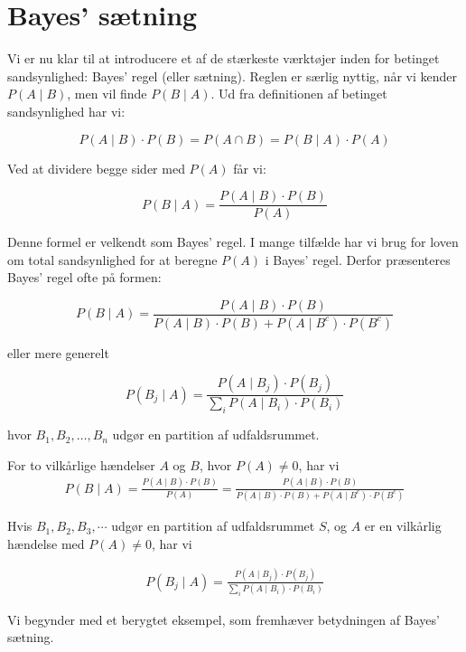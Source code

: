 \section{Bayes' sætning}
Vi er nu klar til at introducere et af de stærkeste værktøjer inden for betinget sandsynlighed: Bayes' regel (eller sætning). Reglen er særlig nyttig, når vi kender \( P(A \mid B) \), men vil finde \( P(B \mid A) \). Ud fra definitionen af betinget sandsynlighed har vi:

\[
P(A \mid B) \cdot P(B) = P(A \cap B) = P(B \mid A) \cdot P(A)
\]

Ved at dividere begge sider med \( P(A) \) får vi:

\[
P(B \mid A) = \frac{P(A \mid B) \cdot P(B)}{P(A)}
\]

Denne formel er velkendt som Bayes' regel. I mange tilfælde har vi brug for loven om total sandsynlighed for at beregne \( P(A) \) i Bayes' regel. Derfor præsenteres Bayes' regel ofte på formen:

\[
P(B \mid A) = \frac{P(A \mid B) \cdot P(B)}{P(A \mid B) \cdot P(B) + P(A \mid B^c) \cdot P(B^c)}
\]

eller mere generelt

\[
P\left(B_j \mid A\right) = \frac{P\left(A \mid B_j\right) \cdot P\left(B_j\right)}{\sum_i P\left(A \mid B_i\right) \cdot P\left(B_i\right)}
\]

hvor \( B_1, B_2, \ldots, B_n \) udgør en partition af udfaldsrummet.

\begin{theorem}
    For to vilkårlige hændelser $A$ og $B$, hvor $P(A) \neq 0$, har vi
    \begin{align*}
    P(B \mid A) = \frac{P(A \mid B) \cdot P(B)}{P(A)}
     = \frac{P(A \mid B) \cdot P(B)}{P(A \mid B) \cdot P(B) + P(A \mid B^c) \cdot P(B^c)}
    \end{align*}

    Hvis $B_1, B_2, B_3, \cdots$ udgør en partition af udfaldsrummet $S$, og $A$ er en vilkårlig hændelse med $P(A) \neq 0$, har vi

    \begin{align*}
    P\left(B_j \mid A\right) = \frac{P\left(A \mid B_j\right) \cdot P\left(B_j\right)}{\sum_i P\left(A \mid B_i\right) \cdot P\left(B_i\right)}
    \end{align*}
\end{theorem}

Vi begynder med et berygtet eksempel, som fremhæver betydningen af Bayes' sætning.

